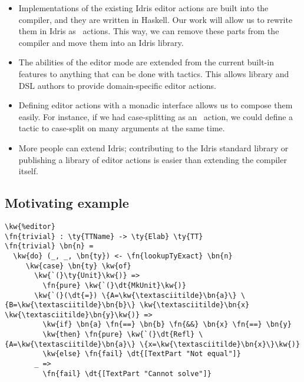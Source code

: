 \begin{itemize}
\item Implementations of the existing Idris editor actions are
built into the compiler, and they are written in Haskell. Our work will allow
us to rewrite them in Idris as \Elab\ actions. This way, we can remove these
parts from the compiler and move them into an Idris library.
\item The abilities of the editor mode are extended from the
current built-in features to anything that can be done with tactics. This
allows library and DSL authors to provide domain-specific editor actions.
\item Defining editor actions with a monadic interface allows us to
compose them easily. For instance, if we had case-splitting as an
\Elab\ action, we could define a tactic to case-split on many arguments at the
same time.
\item More people can extend Idris; contributing to the Idris standard library
  or publishing a library of editor actions is easier than extending the
    compiler itself.
\end{itemize}


\subsection{Motivating example}


\begin{Verbatim}
\kw{%editor}
\fn{trivial} : \ty{TTName} -> \ty{Elab} \ty{TT}
\fn{trivial} \bn{n} =
  \kw{do} (_, _, \bn{ty}) <- \fn{lookupTyExact} \bn{n}
     \kw{case} \bn{ty} \kw{of}
       \kw{`(}\ty{Unit}\kw{)} =>
         \fn{pure} \kw{`(}\dt{MkUnit}\kw{)}
       \kw{`(}(\dt{=}) \{A=\kw{\textasciitilde}\bn{a}\} \{B=\kw{\textasciitilde}\bn{b}\} \kw{\textasciitilde}\bn{x} \kw{\textasciitilde}\bn{y}\kw{)} =>
         \kw{if} \bn{a} \fn{==} \bn{b} \fn{&&} \bn{x} \fn{==} \bn{y}
         \kw{then} \fn{pure} \kw{`(}\dt{Refl} \{A=\kw{\textasciitilde}\bn{a}\} \{x=\kw{\textasciitilde}\bn{x}\}\kw{)}
         \kw{else} \fn{fail} \dt{[TextPart "Not equal"]}
       _ =>
         \fn{fail} \dt{[TextPart "Cannot solve"]}


\end{Verbatim}


